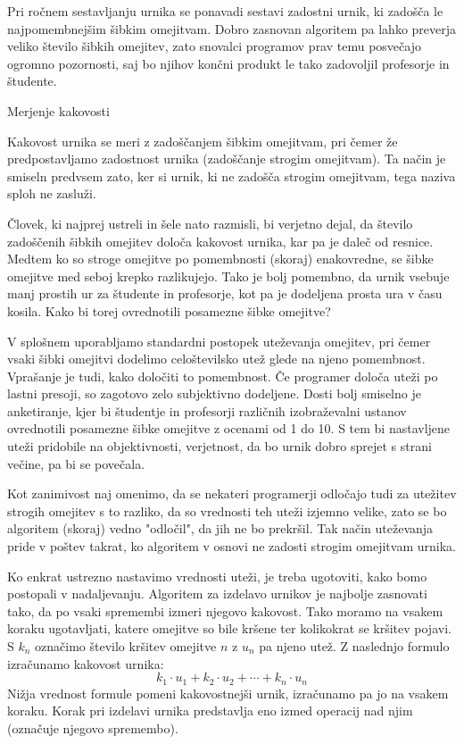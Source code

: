 \documentclass[a4paper,10pt]{article}
\begin{document}
Pri ročnem sestavljanju urnika se ponavadi sestavi zadostni urnik, ki zadošča le
najpomembnejšim šibkim omejitvam. Dobro zasnovan algoritem pa lahko preverja veliko
število šibkih omejitev, zato snovalci programov prav temu posvečajo ogromno pozornosti,
saj bo njihov končni produkt le tako zadovoljil profesorje in študente.

Merjenje kakovosti %

Kakovost urnika se meri z zadoščanjem šibkim omejitvam, pri čemer že predpostavljamo
zadostnost urnika (zadoščanje strogim omejitvam). Ta način je smiseln predvsem zato,
ker si urnik, ki ne zadošča strogim omejitvam, tega naziva sploh ne zasluži.

Človek, ki najprej ustreli in šele nato razmisli, bi verjetno dejal, da število
zadoščenih šibkih omejitev določa kakovost urnika, kar pa je daleč od resnice. Medtem
ko so stroge omejitve po pomembnosti (skoraj) enakovredne, se šibke omejitve med seboj
krepko razlikujejo. Tako je bolj pomembno, da urnik vsebuje manj prostih ur za
študente in profesorje, kot pa je dodeljena prosta ura v času kosila. Kako bi torej
ovrednotili posamezne šibke omejitve?

V splošnem uporabljamo standardni postopek uteževanja omejitev, pri čemer vsaki šibki
omejitvi dodelimo celoštevilsko utež glede na njeno pomembnost. Vprašanje je tudi, kako
določiti to pomembnost. Če programer določa uteži po lastni presoji, so zagotovo zelo
subjektivno dodeljene. Dosti bolj smiselno je anketiranje, kjer bi študentje in profesorji
različnih izobraževalni ustanov ovrednotili posamezne šibke omejitve z ocenami od 1 do 10.
S tem bi nastavljene uteži pridobile na objektivnosti, verjetnost, da bo urnik dobro
sprejet s strani večine, pa bi se povečala.

Kot zanimivost naj omenimo, da se nekateri programerji odločajo tudi za utežitev strogih
omejitev s to razliko, da so vrednosti teh uteži izjemno velike, zato se bo algoritem
(skoraj) vedno "odločil", da jih ne bo prekršil. Tak način uteževanja pride v poštev
takrat, ko algoritem v osnovi ne zadosti strogim omejitvam urnika.

Ko enkrat ustrezno nastavimo vrednosti uteži, je treba ugotoviti, kako bomo postopali
v nadaljevanju. Algoritem za izdelavo urnikov je najbolje zasnovati tako, da po vsaki
spremembi izmeri njegovo kakovost. Tako moramo na vsakem koraku ugotavljati, katere
omejitve so bile kršene ter kolikokrat se kršitev pojavi. S $k_n$ označimo število
kršitev omejitve $n$ z $u_n$ pa njeno utež. Z naslednjo formulo izračunamo
kakovost urnika:
\[ k_1 \cdot u_1 + k_2 \cdot u_2 + \cdots + k_n \cdot u_n \]
Nižja vrednost formule pomeni kakovostnejši urnik, izračunamo pa jo na vsakem koraku.
Korak pri izdelavi urnika predstavlja eno izmed operacij nad njim (označuje njegovo
spremembo).
\end{document}
